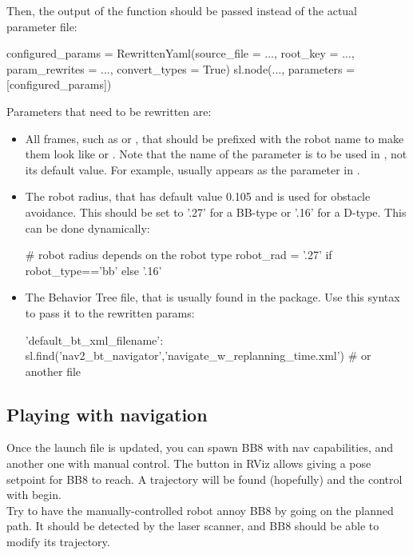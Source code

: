 \documentclass{ecnreport}
\begin{document}
Then, the output of the function should be passed instead of the actual parameter file:
\begin{pythoncodelarge}
configured_params = RewrittenYaml(source_file = ...,
                                    root_key = ..., 
                                    param_rewrites = ...,
                                    convert_types = True)
sl.node(..., parameters = [configured_params])
\end{pythoncodelarge}

Parameters that need to be rewritten are:
\begin{itemize}
 \item All frames, such as  or , that should be prefixed with the robot name to make them look like  or . Note that the name of the parameter is to be used in , not its default value. For example,  usually appears as the  parameter in .
 \item The robot radius, that has default value 0.105 and is used for obstacle avoidance. This should be set to '.27' for a BB-type or '.16' for a D-type. This can be done dynamically:
\begin{pythoncodelarge}
# robot radius depends on the robot type
robot_rad = '.27' if robot_type=='bb' else '.16'
\end{pythoncodelarge}
\item The Behavior Tree file, that is usually found in the  package. Use this syntax to pass it to the rewritten params:
\begin{pythoncode}
 'default_bt_xml_filename': sl.find('nav2_bt_navigator','navigate_w_replanning_time.xml')   # or another file
\end{pythoncode}
\end{itemize}

\subsection{Playing with navigation}

Once the launch file is updated, you can spawn BB8 with nav capabilities, and another one with manual control. The  button in RViz allows giving a pose setpoint for BB8 to reach. A trajectory will be found (hopefully) and the control with begin.\\

Try to have the manually-controlled robot annoy BB8 by going on the planned path. It should be detected by the laser scanner, and BB8 should be able to modify its trajectory.\\
\end{document}
